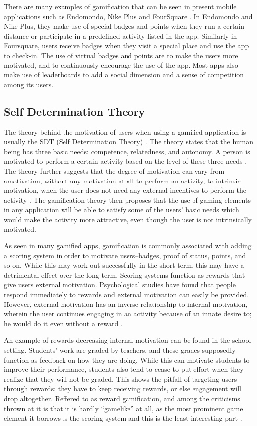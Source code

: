 There are many examples of gamification that can be seen in present mobile applications such as Endomondo, Nike Plus and FourSquare \cite{alidarejeh2016}. In Endomondo and Nike Plus, they make use of special badges and points when they run a certain distance or participate in a predefined activity listed in the app. Similarly in Foursquare, users receive badges when they visit a special place and use the app to check-in. The use of virtual badges and points are to make the users more motivated, and to continuously encourage the use of the app. Most apps also make use of leaderboards to add a social dimension and a sense of competition among its users.

\subsection{Self Determination Theory}

The theory behind the motivation of users when using a gamified application is usually the SDT (Self Determination Theory) \cite{karlmkapp2012}. The theory states that the human being has three basic needs: competence, relatedness, and autonomy. A person is motivated to perform a certain activity based on the level of these three needs \cite{andrade2016bright}. The theory further suggests that the degree of motivation can vary from amotivation, without any motivation at all to perform an activity, to intrinsic motivation, when the user does not need any external incentives to perform the activity \cite{karlmkapp2012}. The gamification theory then proposes that the use of gaming elements in any application will be able to satisfy some of the users’ basic needs which would make the activity more attractive, even though the user is not intrinsically motivated.

As seen in many gamified apps, gamification is commonly associated with adding a scoring system in order to motivate users--badges, proof of status, points, and so on. While this may work out successfully in the short term, this may have a detrimental effect over the long-term. Scoring systems function as rewards that give users external motivation. Psychological studies have found that people respond immediately to rewards and external motivation can easily be provided. However, external motivation has an inverse relationship to internal motivation, wherein the user continues engaging in an activity because of an innate desire to; he would do it even without a reward \cite{reeve2004}.

An example of rewards decreasing internal motivation can be found in the school setting. Students’ work are graded by teachers, and these grades supposedly function as feedback on how they are doing. While this can motivate students to improve their performance, students also tend to cease to put effort when they realize that they will not be graded. This shows the pitfall of targeting users through rewards: they have to keep receiving rewards, or else engagement will drop altogether. Reffered to as reward gamification, and among the criticisms thrown at it is that it is hardly “gamelike” at all, as the most prominent game element it borrows is the scoring system and this is the least interesting part \cite{nicholson2012user}.

